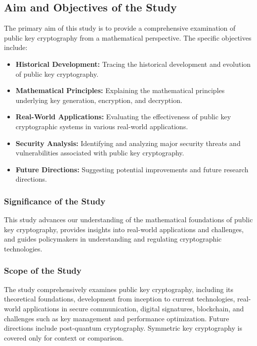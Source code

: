 \documentclass{beamer}
\begin{document}
\begin{frame}
\subsection{Aim and Objectives of the Study}
The primary aim of this study is to provide a comprehensive examination of public key cryptography from a mathematical perspective. The specific objectives include:
\begin{itemize}
    \item \textbf{Historical Development:} Tracing the historical development and evolution of public key cryptography.
    \item \textbf{Mathematical Principles:} Explaining the mathematical principles underlying key generation, encryption, and decryption.
    \item \textbf{Real-World Applications:} Evaluating the effectiveness of public key cryptographic systems in various real-world applications.
    \item \textbf{Security Analysis:} Identifying and analyzing major security threats and vulnerabilities associated with public key cryptography.
    \item \textbf{Future Directions:} Suggesting potential improvements and future research directions.
\end{itemize}
\end{frame}

\begin{frame}
\frametitle{Significance of the Study}
This study advances our understanding of the mathematical foundations of public key cryptography, provides insights into real-world applications and challenges, and guides policymakers in understanding and regulating cryptographic technologies.
\end{frame}

\begin{frame}
\frametitle{Scope of the Study}
The study comprehensively examines public key cryptography, including its theoretical foundations, development from inception to current technologies, real-world applications in secure communication, digital signatures, blockchain, and challenges such as key management and performance optimization. Future directions include post-quantum cryptography. Symmetric key cryptography is covered only for context or comparison.
\end{frame}
\end{document}
